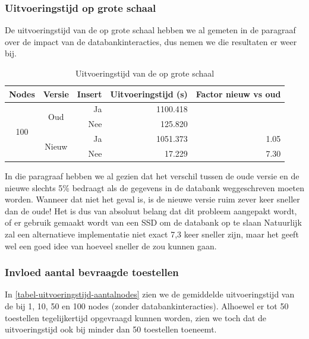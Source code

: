 \subsubsection{Uitvoeringstijd op grote schaal}

De uitvoeringstijd van de \nwmretriever{} op grote schaal hebben we al gemeten in de paragraaf over de impact van de databankinteracties,
dus nemen we die resultaten er weer bij.

\begin{table}[h]
\centering
\begin{tabular}{@{}ccrrr@{}}
\toprule
\multicolumn{1}{l}{Nodes} & \multicolumn{1}{l}{Versie} & Insert & Uitvoeringstijd (s) & Factor nieuw vs oud \\ \midrule
\multirow{4}{*}{100}      & \multirow{2}{*}{Oud}       & Ja     & 1100.418            &                     \\
                          &                            & Nee    & 125.820             &                     \\
                          & \multirow{2}{*}{Nieuw}     & Ja     & 1051.373            & 1.05                \\
                          &                            & Nee    & 17.229              & 7.30                \\ \bottomrule
\end{tabular}
\caption{Uitvoeringstijd van de \nwmretriever{} op grote schaal}
\label{tabel-uitvoeringstijd-vwall}
\end{table}

In die paragraaf hebben we al gezien dat het verschil tussen de oude versie en de nieuwe slechts 5\% bedraagt
als de gegevens in de databank weggeschreven moeten worden.
Wanneer dat niet het geval is, is de nieuwe versie ruim zever keer sneller dan de oude!
Het is dus van absoluut belang dat dit probleem aangepakt wordt, of er gebruik gemaakt wordt van een SSD om de databank op te slaan
Natuurlijk zal een alternatieve implementatie niet exact 7,3 keer sneller zijn, maar het geeft wel een goed idee
van hoeveel sneller de \nwmretriever{} zou kunnen gaan.

\subsubsection{Invloed aantal bevraagde toestellen}

In \cref{tabel-uitvoeringstijd-aantalnodes} zien we de gemiddelde uitvoeringstijd van de \nwmretriever{} bij 1, 10, 50 en 100 nodes (zonder databankinteracties).
Alhoewel er tot 50 toestellen tegelijkertijd opgevraagd kunnen worden, zien we toch dat de uitvoeringstijd ook bij minder dan 50 toestellen toeneemt.

